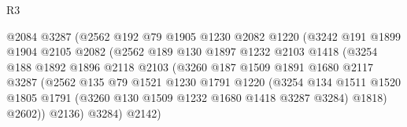 \begin{lexlean}{R3}
\begin{coremodule}
                                  @2084
                                  @3287
                                  (@2562
                                    @192
                                    @79
                                    @1905
                                    @1230
                                    @2082
                                    @1220
                                    (@3242
                                      @191
                                      @1899
                                      @1904
                                      @2105
                                      @2082
                                      (@2562
                                        @189
                                        @130
                                        @1897
                                        @1232
                                        @2103
                                        @1418
                                        (@3254
                                          @188
                                          @1892
                                          @1896
                                          @2118
                                          @2103
                                          (@3260
                                            @187
                                            @1509
                                            @1891
                                            @1680
                                            @2117
                                            @3287
                                            (@2562
                                              @135
                                              @79
                                              @1521
                                              @1230
                                              @1791
                                              @1220
                                              (@3254
                                                @134
                                                @1511
                                                @1520
                                                @1805
                                                @1791
                                                (@3260 @130 @1509 @1232 @1680 @1418 @3287 @3284)
                                                @1818)
                                              @2602))
                                          @2136)
                                        @3284)
                                      @2142)

\end{coremodule}
\end{lexlean}
